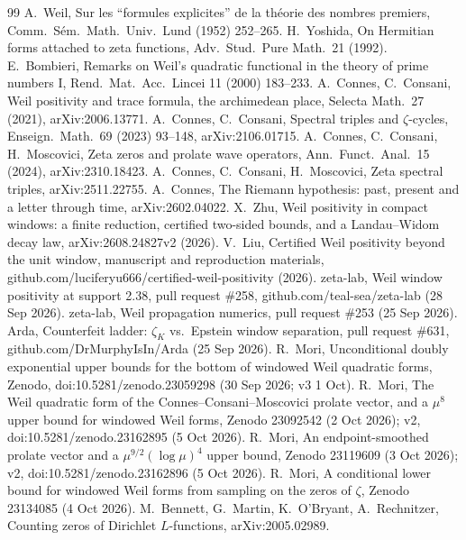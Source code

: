 \documentclass[11pt]{article}
\theoremstyle{remark}
\begin{document}
\begin{thebibliography}{99}
 A.~Weil, Sur les ``formules explicites'' de la théorie des nombres premiers, Comm.\ Sém.\ Math.\ Univ.\ Lund (1952) 252--265.
 H.~Yoshida, On Hermitian forms attached to zeta functions, Adv.\ Stud.\ Pure Math.\ 21 (1992).
 E.~Bombieri, Remarks on Weil's quadratic functional in the theory of prime numbers I, Rend.\ Mat.\ Acc.\ Lincei 11 (2000) 183--233.
 A.~Connes, C.~Consani, Weil positivity and trace formula, the archimedean place, Selecta Math.\ 27 (2021), arXiv:2006.13771.
 A.~Connes, C.~Consani, Spectral triples and $\zeta$-cycles, Enseign.\ Math.\ 69 (2023) 93--148, arXiv:2106.01715.
 A.~Connes, C.~Consani, H.~Moscovici, Zeta zeros and prolate wave operators, Ann.\ Funct.\ Anal.\ 15 (2024), arXiv:2310.18423.
 A.~Connes, C.~Consani, H.~Moscovici, Zeta spectral triples, arXiv:2511.22755.
 A.~Connes, The Riemann hypothesis: past, present and a letter through time, arXiv:2602.04022.
 X.~Zhu, Weil positivity in compact windows: a finite reduction, certified two-sided bounds, and a Landau--Widom decay law, arXiv:2608.24827v2 (2026).
 V.~Liu, Certified Weil positivity beyond the unit window, manuscript and reproduction materials, github.com/luciferyu666/certified-weil-positivity (2026).
 zeta-lab, Weil window positivity at support 2.38, pull request \#258, github.com/teal-sea/zeta-lab (28 Sep 2026).
 zeta-lab, Weil propagation numerics, pull request \#253 (25 Sep 2026).
 Arda, Counterfeit ladder: $\zeta_K$ vs.\ Epstein window separation, pull request \#631, github.com/DrMurphyIsIn/Arda (25 Sep 2026).
 R.~Mori, Unconditional doubly exponential upper bounds for the bottom of windowed Weil quadratic forms, Zenodo, doi:10.5281/zenodo.23059298 (30 Sep 2026; v3 1 Oct).
 R.~Mori, The Weil quadratic form of the Connes--Consani--Moscovici prolate vector, and a $\mu^8$ upper bound for windowed Weil forms, Zenodo 23092542 (2 Oct 2026); v2, doi:10.5281/zenodo.23162895 (5 Oct 2026).
 R.~Mori, An endpoint-smoothed prolate vector and a $\mu^{9/2}(\log\mu)^4$ upper bound, Zenodo 23119609 (3 Oct 2026); v2, doi:10.5281/zenodo.23162896 (5 Oct 2026).
 R.~Mori, A conditional lower bound for windowed Weil forms from sampling on the zeros of $\zeta$, Zenodo 23134085 (4 Oct 2026).
 M.~Bennett, G.~Martin, K.~O'Bryant, A.~Rechnitzer, Counting zeros of Dirichlet $L$-functions, arXiv:2005.02989.

\end{thebibliography}
\end{document}
